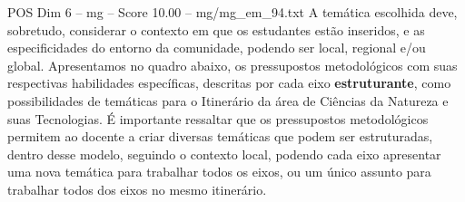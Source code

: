 \begin{textsample}{POS Dim 6 – mg – Score 10.00 – mg/mg\_em\_94.txt}
A temática escolhida deve, sobretudo, considerar o contexto em que os estudantes estão inseridos, e as especificidades do entorno da comunidade, podendo ser local, regional e/ou global.
Apresentamos no quadro abaixo, os pressupostos metodológicos com suas respectivas habilidades específicas, descritas por cada eixo \textbf{estruturante}, como possibilidades de temáticas para o Itinerário da área de Ciências da Natureza e suas Tecnologias.
É importante ressaltar que os pressupostos metodológicos permitem ao docente a criar diversas temáticas que podem ser estruturadas, dentro desse modelo, seguindo o contexto local, podendo cada eixo apresentar uma nova temática para trabalhar todos os eixos, ou um único assunto para trabalhar todos dos eixos no mesmo itinerário.

\end{textsample}
